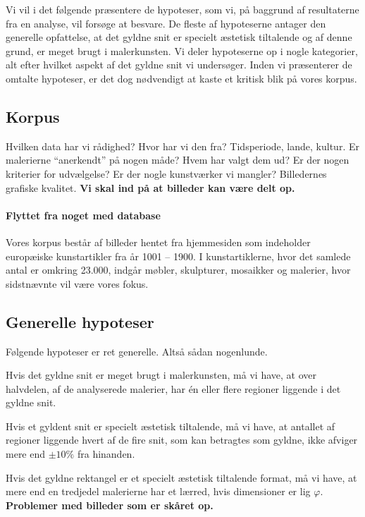 {
{\sffamily Vi vil i det følgende præsentere de hypoteser, som vi, på
baggrund af resultaterne fra en analyse, vil forsøge at besvare. De
fleste af hypoteserne antager den generelle opfattelse, at det gyldne
snit er specielt æstetisk tiltalende og af denne grund, er meget brugt i
malerkunsten. Vi deler hypoteserne op i nogle kategorier, alt efter
hvilket aspekt af det gyldne snit vi undersøger. Inden vi præsenterer de
omtalte hypoteser, er det dog nødvendigt at kaste et kritisk blik på
vores korpus.
}

\subsection{Korpus}
Hvilken data har vi rådighed? Hvor har vi den fra? Tidsperiode, lande,
kultur. Er malerierne ``anerkendt'' på nogen måde? Hvem har valgt dem
ud? Er der nogen kriterier for udvælgelse? Er der nogle kunstværker vi
mangler? Billedernes grafiske kvalitet. \textbf{Vi skal ind på at
billeder kan være delt op.}

\paragraph{Flyttet fra noget med database}
Vores korpus består af billeder hentet fra hjemmesiden \cite{wgahu} som
indeholder europæiske kunstartikler fra år 1001 -- 1900. I
kunstartiklerne, hvor det samlede antal er omkring 23.000, indgår
møbler, skulpturer, mosaikker og malerier, hvor sidstnævnte vil være
vores fokus.

\subsection{Generelle hypoteser}
Følgende hypoteser er ret generelle. Altså sådan nogenlunde.

\begin{hypotese}
    Hvis det gyldne snit er meget brugt i malerkunsten, må vi have, at
    over halvdelen, af de analyserede malerier, har én eller flere
    regioner liggende i det gyldne snit.
\end{hypotese}

\begin{hypotese}
    Hvis et gyldent snit er specielt æstetisk tiltalende, må vi have, at
    antallet af regioner liggende hvert af de fire snit, som kan
    betragtes som gyldne, ikke afviger mere end $\pm10\%$ fra hinanden.
\end{hypotese}

\begin{hypotese}
    Hvis det gyldne rektangel er et specielt æstetisk tiltalende format,
    må vi have, at mere end en tredjedel malerierne har et lærred, hvis
    dimensioner er lig $\varphi$. \textbf{Problemer med billeder som er
    skåret op.}
\end{hypotese}

}
